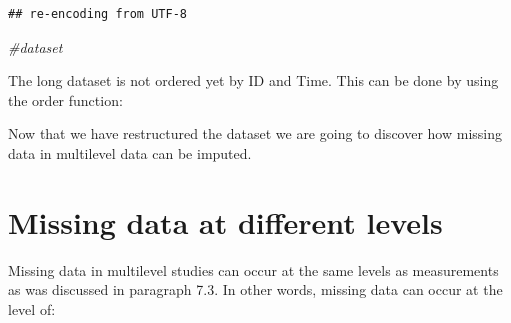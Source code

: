 \documentclass[]{book}
\newenvironment{Shaded}{\begin{snugshade}}{\end{snugshade}}
\newcommand{\KeywordTok}[1]{\textcolor[rgb]{0.13,0.29,0.53}{\textbf{#1}}}
\newcommand{\StringTok}[1]{\textcolor[rgb]{0.31,0.60,0.02}{#1}}
\newcommand{\CommentTok}[1]{\textcolor[rgb]{0.56,0.35,0.01}{\textit{#1}}}
\newcommand{\OperatorTok}[1]{\textcolor[rgb]{0.81,0.36,0.00}{\textbf{#1}}}
\newcommand{\NormalTok}[1]{#1}
\theoremstyle{definition}
\theoremstyle{definition}
\theoremstyle{definition}
\theoremstyle{remark}
\begin{document}
\begin{verbatim}
## re-encoding from UTF-8
\end{verbatim}

\begin{Shaded}
\begin{Highlighting}[]
\CommentTok{#dataset}
\end{Highlighting}
\end{Shaded}

The long dataset is not ordered yet by ID and Time. This can be done by
using the order function:

\begin{Shaded}
\end{Shaded}

Now that we have restructured the dataset we are going to discover how
missing data in multilevel data can be imputed.

\section{Missing data at different
levels}\label{missing-data-at-different-levels-1}

Missing data in multilevel studies can occur at the same levels as
measurements as was discussed in paragraph 7.3. In other words, missing
data can occur at the level of:
\end{document}

